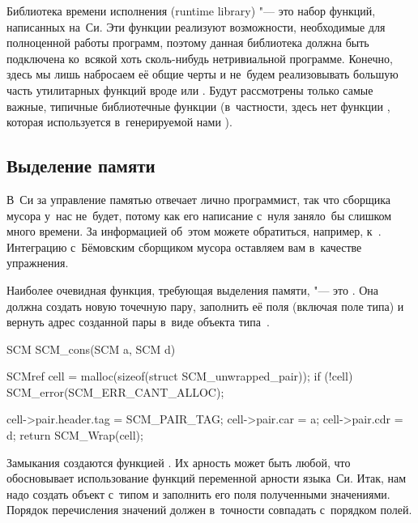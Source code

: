 Библиотека времени исполнения (runtime library) "--- это набор функций,
написанных на~Си. Эти функции реализуют возможности, необходимые для полноценной
работы программ, поэтому данная библиотека должна быть подключена ко~всякой хоть
сколь-нибудь нетривиальной программе. Конечно, здесь мы лишь набросаем её общие
черты и не~будем реализовывать большую часть утилитарных функций вроде
 или . Будут рассмотрены только самые
важные, типичные библиотечные функции (в~частности, здесь нет функции
, которая используется в~генерируемой нами ).


\subsection{Выделение памяти}\label{cc/runtime/ssect:alloc}

В~Си за управление памятью отвечает лично программист, так что сборщика мусора
у~нас не~будет, потому как его написание с~нуля заняло~бы слишком много времени.
За информацией об~этом можете обратиться, например, к~\cite{spi90,wil92}.%
{\fnstyle{\RaggedRight}} Интеграцию с~Бёмовским сборщиком мусора \cite{bw88} оставляем
вам в~качестве упражнения.

Наиболее очевидная функция, требующая выделения памяти, "--- это . Она
должна создать новую точечную пару, заполнить её поля (включая поле типа) и
вернуть адрес созданной пары в~виде объекта типа~.

\begin{code:c}
SCM SCM_cons(SCM a, SCM d)
{
    SCMref cell = malloc(sizeof(struct SCM_unwrapped_pair));
    if (!cell)
    {
        SCM_error(SCM_ERR_CANT_ALLOC);
    }

    cell->pair.header.tag = SCM_PAIR_TAG;
    cell->pair.car = a;
    cell->pair.cdr = d;
    return SCM_Wrap(cell);
}
\end{code:c}

Замыкания создаются функцией . Их арность может быть любой, что
обосновывает использование функций переменной арности языка~Си. Итак, нам надо
создать объект с~типом  и заполнить его поля полученными
значениями. Порядок перечисления значений должен в~точности совпадать
с~порядком полей.

